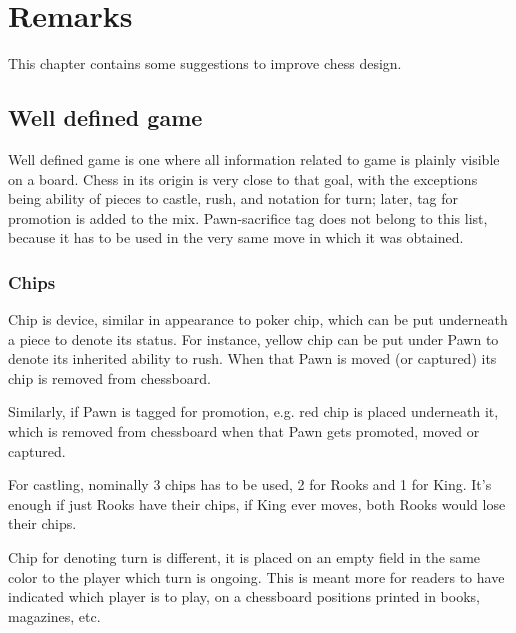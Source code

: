 

\chapter*{Remarks}
\label{ch:Remarks}

This chapter contains some suggestions to improve chess design.

\section*{Well defined game}
\label{sec:Remarks/Well defined game}

Well defined game is one where all information related to game is plainly
visible on a board. Chess in its origin is very close to that goal, with
the exceptions being ability of pieces to castle, rush, and notation for
turn; later, tag for promotion is added to the mix. Pawn-sacrifice tag
does not belong to this list, because it has to be used in the very same
move in which it was obtained.

\subsection*{Chips}
\label{sec:Remarks/Chips}

Chip is device, similar in appearance to poker chip, which can be put
underneath a piece to denote its status. For instance, yellow chip can be
put under Pawn to denote its inherited ability to rush. When that Pawn is
moved (or captured) its chip is removed from chessboard.

Similarly, if Pawn is tagged for promotion, e.g. red chip is placed
underneath it, which is removed from chessboard when that Pawn gets promoted,
moved or captured.

For castling, nominally 3 chips has to be used, 2 for Rooks and 1 for King.
It's enough if just Rooks have their chips, if King ever moves, both Rooks
would lose their chips.

Chip for denoting turn is different, it is placed on an empty field in the
same color to the player which turn is ongoing. This is meant more for
readers to have indicated which player is to play, on a chessboard positions
printed in books, magazines, etc.

